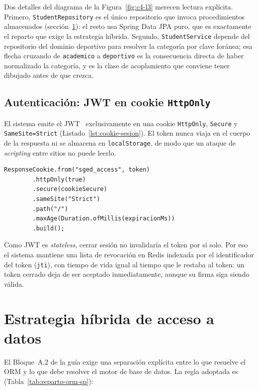 \documentclass[11pt,a4paper]{article}
\newcommand{\ruta}[1]{\texttt{\footnotesize #1}}
\begin{document}
Dos detalles del diagrama de la Figura~\ref{fig:c4-l3} merecen lectura
explícita. Primero,
\texttt{StudentRepository} es el único repositorio que invoca
procedimientos almacenados (sección~\ref{sec:acceso-datos}): el resto usa
Spring Data JPA puro, que es exactamente el reparto que exige la estrategia
híbrida. Segundo, \texttt{StudentService} depende del repositorio del
dominio deportivo para resolver la categoría por clave foránea; esa flecha
cruzando de \texttt{academico} a \texttt{deportivo} es la consecuencia
directa de haber normalizado la categoría, y es la clase de acoplamiento
que conviene tener dibujado antes de que crezca.

\subsection{Autenticación: JWT en cookie \texttt{HttpOnly}}
\label{sec:jwt-cookie}

El sistema emite el JWT~\cite{rfc7519} exclusivamente en una cookie
\texttt{HttpOnly}, \texttt{Secure} y \texttt{SameSite=Strict}
(Listado~\ref{lst:cookie-sesion}). El token nunca
viaja en el cuerpo de la respuesta ni se almacena en \texttt{localStorage},
de modo que un ataque de \emph{scripting} entre sitios no puede leerlo.

\begin{lstlisting}[caption={Emisión de la cookie de sesión (\ruta{AuthController.java})},label={lst:cookie-sesion}]
ResponseCookie.from("sged_access", token)
        .httpOnly(true)
        .secure(cookieSecure)
        .sameSite("Strict")
        .path("/")
        .maxAge(Duration.ofMillis(expiracionMs))
        .build();
\end{lstlisting}

Como JWT es \emph{stateless}, cerrar sesión no invalidaría el token por sí
solo. Por eso el sistema mantiene una lista de revocación en Redis indexada
por el identificador del token (\texttt{jti}), con tiempo de vida igual al
tiempo que le restaba al token: un token cerrado deja de ser aceptado
inmediatamente, aunque su firma siga siendo válida.

\section{Estrategia híbrida de acceso a datos}
\label{sec:acceso-datos}

El Bloque~A.2 de la guía exige una separación explícita entre lo que resuelve
el ORM y lo que debe resolver el motor de base de datos. La regla adoptada
es (Tabla~\ref{tab:reparto-orm-sp}):
\end{document}
